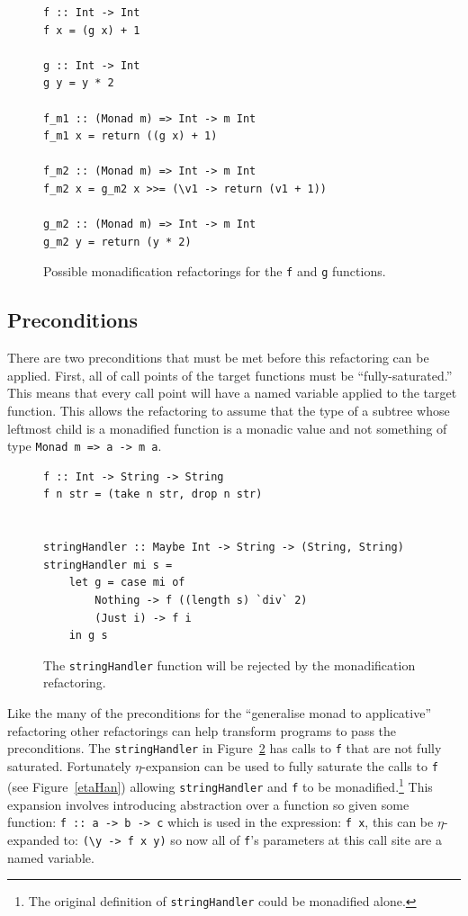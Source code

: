  

\begin{figure}[t]
\begin{lstlisting}
f :: Int -> Int
f x = (g x) + 1

g :: Int -> Int
g y = y * 2

f_m1 :: (Monad m) => Int -> m Int
f_m1 x = return ((g x) + 1)

f_m2 :: (Monad m) => Int -> m Int
f_m2 x = g_m2 x >>= (\v1 -> return (v1 + 1))

g_m2 :: (Monad m) => Int -> m Int
g_m2 y = return (y * 2)
\end{lstlisting}
\caption{Possible monadification refactorings for the \texttt{f} and \texttt{g} functions.}
\label{fgMon}
\end{figure} 

\subsection{Preconditions}

There are two preconditions that must be met before this refactoring can be applied. First, all of call points of the target functions must be ``fully-saturated.'' This means that every call point will have a named variable applied to the target function. This allows the refactoring to assume that the type of a subtree whose leftmost child is a monadified function is a monadic value and not something of type \texttt{Monad m => a -> m a}. 

\begin{figure}[t]
\begin{lstlisting}
f :: Int -> String -> String
f n str = (take n str, drop n str)


stringHandler :: Maybe Int -> String -> (String, String)
stringHandler mi s = 
	let g = case mi of
		Nothing -> f ((length s) `div` 2)
		(Just i) -> f i
	in g s
\end{lstlisting}
\caption{The \texttt{stringHandler} function will be rejected by the monadification refactoring.}
\label{strHan}
\end{figure}

Like the many of the preconditions for the ``generalise monad to applicative'' refactoring other refactorings can help transform programs to pass the preconditions. The \texttt{stringHandler} in Figure~\ref{strHan} has calls to \texttt{f} that are not fully saturated. Fortunately $\eta$-expansion can be used to fully saturate the calls to \texttt{f} (see Figure~\ref{etaHan}) allowing \texttt{stringHandler} and \texttt{f} to be monadified.\footnote{The original definition of \texttt{stringHandler} could be monadified alone.} This expansion involves introducing abstraction over a function so given some function: \texttt{f :: a -> b -> c} which is used in the expression: \texttt{f x}, this can be $\eta$-expanded to: \texttt{(\textbackslash y -> f x y)} so now all of \texttt{f}'s parameters at this call site are a named variable. 

